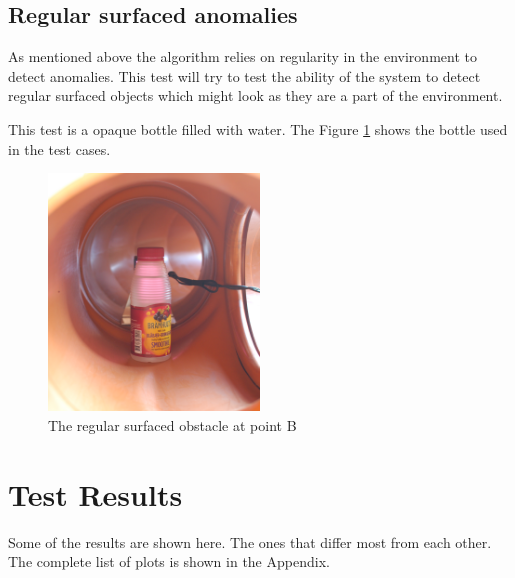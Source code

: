 \subsection{Regular surfaced anomalies}
As mentioned above the algorithm relies on regularity in the environment to detect
anomalies. This test will try to test the ability of the system to detect regular surfaced
objects which might look as they are a part of the environment. 

This test is a opaque bottle filled with water. The Figure \ref{chap7:fig-regular-at-B}
shows the bottle used in the test cases.
\begin{figure}[htbp]
    \centering
    \includegraphics[width=0.5\textwidth]{pics/pos2-regular-tof}
    \caption{The regular surfaced obstacle at point B}
    \label{chap7:fig-regular-at-B}
\end{figure}



\section{Test Results}
Some of the results are shown here. The ones that differ most from each other. The
complete list of plots is shown in the Appendix. 

